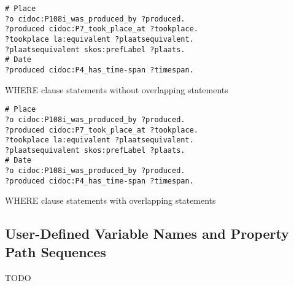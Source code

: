 %
\begin{listing}[htbp]
    \begin{verbatim}
# Place
?o cidoc:P108i_was_produced_by ?produced.
?produced cidoc:P7_took_place_at ?tookplace.
?tookplace la:equivalent ?plaatsequivalent.
?plaatsequivalent skos:prefLabel ?plaats.
# Date
?produced cidoc:P4_has_time-span ?timespan.
    \end{verbatim}
    \caption{WHERE clause statements without overlapping statements}
    \label{lst:where_statements_no_overlapping}
\end{listing}
\begin{listing}[htbp]
    \begin{verbatim}
# Place
?o cidoc:P108i_was_produced_by ?produced.
?produced cidoc:P7_took_place_at ?tookplace.
?tookplace la:equivalent ?plaatsequivalent.
?plaatsequivalent skos:prefLabel ?plaats.
# Date
?o cidoc:P108i_was_produced_by ?produced.
?produced cidoc:P4_has_time-span ?timespan.
    \end{verbatim}
    \caption{WHERE clause statements with overlapping statements}
    \label{lst:where_statements_overlapping}
\end{listing}

\subsection{User-Defined Variable Names and Property Path Sequences}

TODO

